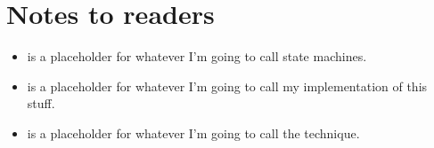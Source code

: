 \section{Notes to readers}

\begin{itemize}
\item {\STateMachine} is a placeholder for whatever I'm going to call
  state machines.
\item {\Implementation} is a placeholder for whatever I'm going to
  call my implementation of this stuff.
\item {\Technique} is a placeholder for whatever I'm going to call the
  technique.
\end{itemize}

